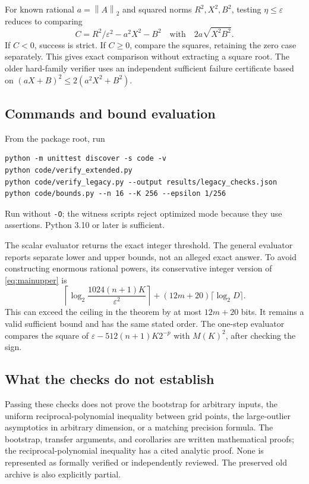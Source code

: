 \documentclass[11pt]{article}
\theoremstyle{remark}\newtheorem{remark}[theorem]{Remark}
\newcommand{\norm}[1]{\left\lVert#1\right\rVert_2}
\newcommand{\eps}{\varepsilon}
\begin{document}
For known rational $a=\norm A$ and squared norms $R^2,X^2,B^2$, testing
$\eta\le\eps$ reduces to comparing
\[
C=R^2/\eps^2-a^2X^2-B^2
\quad\text{with}\quad 2a\sqrt{X^2B^2}.
\]
If $C<0$, success is strict. If $C\ge0$, compare the squares, retaining
the zero case separately. This gives exact comparison without extracting
a square root. The older hard-family verifier uses an independent
sufficient failure certificate based on
$(aX+B)^2\le2(a^2X^2+B^2)$.

\subsection{Commands and bound evaluation}

From the package root, run
\begin{verbatim}
python -m unittest discover -s code -v
python code/verify_extended.py
python code/verify_legacy.py --output results/legacy_checks.json
python code/bounds.py --n 16 --K 256 --epsilon 1/256
\end{verbatim}
Run without \texttt{-O}; the witness scripts reject optimized mode
because they use assertions. Python 3.10 or later is sufficient.

The scalar evaluator returns the exact integer threshold. The general
evaluator reports separate lower and upper bounds, not an alleged exact
answer. To avoid constructing enormous rational powers, its conservative
integer version of \eqref{eq:mainupper} is
\[
\left\lceil\log_2\frac{1024(n+1)K}{\eps^2}\right\rceil
+(12m+20)\lceil\log_2 D\rceil.
\]
This can exceed the ceiling in the theorem by at most $12m+20$ bits.
It remains a valid sufficient bound and has the same stated order.
The one-step evaluator compares the square of
$\eps-512(n+1)K2^{-p}$ with $M(K)^2$, after checking the sign.

\subsection{What the checks do not establish}

Passing these checks does not prove the bootstrap for arbitrary inputs,
the uniform reciprocal-polynomial inequality between grid points, the
large-outlier asymptotics in arbitrary dimension, or a matching precision
formula. The bootstrap, transfer arguments, and corollaries are written
mathematical proofs; the reciprocal-polynomial inequality has a cited
analytic proof. None is represented as formally verified or independently
reviewed. The preserved old archive is also explicitly partial.
\end{document}
